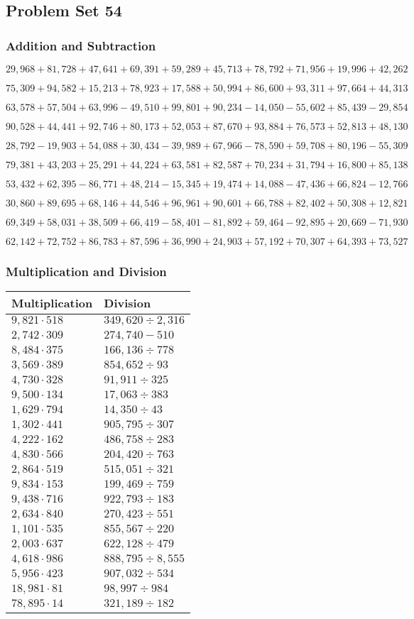 \hypertarget{problem-set-54-3}{%
\subsection{Problem Set 54}\label{problem-set-54-3}}

\hypertarget{addition-and-subtraction-276}{%
\subsubsection{Addition and
Subtraction}\label{addition-and-subtraction-276}}

\(29,968+81,728+47,641+69,391+59,289+45,713+78,792+71,956+19,996+ 42,262\)

\(75,309+94,582+15,213+78,923+17,588+50,994+86,600+93,311+97,664+44,313\)

\(63,578+57,504+63,996-49,510+99,801+90,234-14,050-55,602+85,439-29,854\)

\(90,528+44,441+92,746+80,173+52,053+87,670+93,884+76,573+52,813+48,130\)

\(28,792-19,903+54,088+30,434-39,989+67,966-78,590+59,708+80,196-55,309\)

\(79,381+43,203+25,291+44,224+63,581+82,587+70,234+31,794+16,800+85,138\)

\(53,432+62,395-86,771+48,214-15,345+19,474+14,088-47,436+66,824-12,766\)

\(30,860+89,695+68,146+44,546+96,961+90,601+66,788+82,402+50,308+12,821\)

\(69,349+58,031+38,509+66,419-58,401-81,892+59,464-92,895+20,669-71,930\)

\(62,142+72,752+86,783+87,596+36,990+24,903+57,192+70,307+64,393+73,527\)

\hypertarget{multiplication-and-division-275}{%
\subsubsection{Multiplication and
Division}\label{multiplication-and-division-275}}

\begin{longtable}[]{@{}ll@{}}
\toprule
Multiplication & Division\tabularnewline
\midrule
\endhead
\(9,821\cdot518\) & \(349,620 ÷2,316\)\tabularnewline
\(2,742\cdot309\) & \(274,740-510\)\tabularnewline
\(8,484\cdot375\) & \(166,136÷778\)\tabularnewline
\(3,569\cdot389\) & \(854,652÷93\)\tabularnewline
\(4,730\cdot328\) & \(91,911÷325\)\tabularnewline
\(9,500\cdot134\) & \(17,063÷383\)\tabularnewline
\(1,629\cdot794\) & \(14,350÷43\)\tabularnewline
\(1,302\cdot441\) & \(905,795÷307\)\tabularnewline
\(4,222\cdot162\) & \(486,758÷283\)\tabularnewline
\(4,830\cdot566\) & \(204,420÷763\)\tabularnewline
\(2,864\cdot519\) & \(515,051÷321\)\tabularnewline
\(9,834\cdot153\) & \(199,469÷759\)\tabularnewline
\(9,438\cdot716\) & \(922,793÷183\)\tabularnewline
\(2,634\cdot840\) & \(270,423÷551\)\tabularnewline
\(1,101\cdot535\) & \(855,567÷220\)\tabularnewline
\(2,003\cdot637\) & \(622,128÷479\)\tabularnewline
\(4,618\cdot986\) & \(888,795÷8,555\)\tabularnewline
\(5,956\cdot423\) & \(907,032÷534\)\tabularnewline
\(18,981\cdot81\) & \(98,997÷984\)\tabularnewline
\(78,895\cdot14\) & \(321,189÷182\)\tabularnewline
\bottomrule
\end{longtable}

